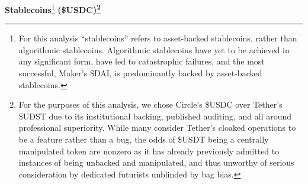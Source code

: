 \documentclass{article}
\begin{document}
\textbf{Stablecoins}\footnote{For this analysis ``stablecoins'' refers to asset-backed stablecoins, rather than algorithmic stablecoins. Algorithmic stablecoins have yet to be achieved in any significant form, have led to catastrophic failures, and the most successful, Maker's \$DAI, is predominantly backed by asset-backed stablecoins.} \textbf{(\$USDC)\footnote{For the purposes of this analysis, we chose Circle's \$USDC over Tether's \$UDST due to its institutional backing, published auditing, and all around professional superiority. While many consider Tether's cloaked operations to be a feature rather than a bug, the odds of \$USDT being a centrally manipulated token are nonzero as it has already previously admitted to instances of being unbacked and manipulated, and thus unworthy of serious consideration by dedicated futurists unblinded by bag bias.}}
\end{document}

